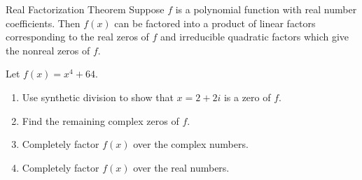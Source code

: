 \begin{theorem1}[realfactorization]{Real Factorization Theorem} Suppose $f$ is a polynomial function with real number coefficients.  Then $f(x)$ can be factored into a product of linear factors corresponding to the real zeros of $f$ and irreducible quadratic factors which give the nonreal zeros of $f$. 
\end{theorem1}


\begin{example}  Let $f(x) = x^4+64$.  

\begin{enumerate}

\item  Use synthetic division to show that $x=2+2i$ is a zero of $f$.

\item  Find the remaining complex zeros of $f$.

\item  Completely factor $f(x)$ over the complex numbers.

\item  Completely factor $f(x)$ over the real numbers.

\end{enumerate}

\end{example}

